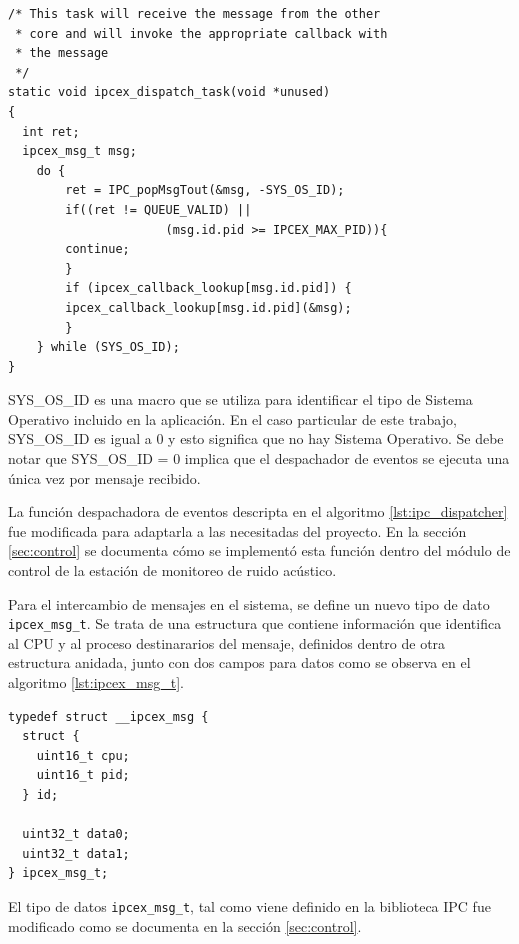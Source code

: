 \begin{lstlisting}[caption={Función despachadora de eventos de la biblioteca IPC.},label={lst:ipc_dispatcher}]
/* This task will receive the message from the other 
 * core and will invoke the appropriate callback with
 * the message
 */
static void ipcex_dispatch_task(void *unused)
{
  int ret;
  ipcex_msg_t msg;
  	do {
    	ret = IPC_popMsgTout(&msg, -SYS_OS_ID);
    	if((ret != QUEUE_VALID) || 
                      (msg.id.pid >= IPCEX_MAX_PID)){
      	continue;
    	}
    	if (ipcex_callback_lookup[msg.id.pid]) {
      	ipcex_callback_lookup[msg.id.pid](&msg);
    	}
  	} while (SYS_OS_ID);
}
\end{lstlisting}
\vspace{5px}
SYS\_OS\_ID es una macro que se utiliza para identificar el tipo de Sistema Operativo incluido en la aplicación.  En el caso particular de este trabajo, SYS\_OS\_ID es igual a 0 y esto significa que no hay Sistema Operativo.  Se debe notar que SYS\_OS\_ID = 0 implica que el despachador de eventos se ejecuta una única vez por mensaje recibido.

La función despachadora de eventos descripta en el algoritmo \ref{lst:ipc_dispatcher} fue modificada para adaptarla a las necesitadas del proyecto.  En la sección \ref{sec:control} se documenta cómo se implementó esta función dentro del módulo de control de la estación de monitoreo de ruido acústico.

Para el intercambio de mensajes en el sistema, se define un nuevo tipo de dato \texttt{ipcex\_msg\_t}.  Se trata de una estructura que contiene información que identifica al CPU y al proceso destinararios del mensaje, definidos dentro de otra estructura anidada, junto con dos campos para datos como se observa en el algoritmo \ref{lst:ipcex_msg_t}. 

\begin{lstlisting}[caption={Definición de un nuevo tipo de dato ipcex\_msg\_t para intercambio de mensajes.},label={lst:ipcex_msg_t}]
typedef struct __ipcex_msg {
  struct {
    uint16_t cpu;
    uint16_t pid;
  } id;

  uint32_t data0;
  uint32_t data1;
} ipcex_msg_t;
\end{lstlisting}

El tipo de datos \texttt{ipcex\_msg\_t}, tal como viene definido en la biblioteca IPC fue modificado como se documenta en la sección \ref{sec:control}.
